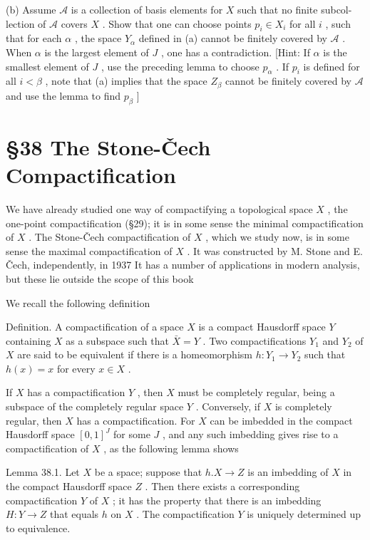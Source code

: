 (b) Assume \(\mathcal{A}\) is a collection of basis elements for \(X\) such that no finite subcol-lection of \(\mathcal{A}\) covers \(X\) . Show that one can choose points \({p}_{i} \in  {X}_{i}\) for all \(i\) , such that for each \(\alpha\) , the space \({Y}_{\alpha }\) defined in (a) cannot be finitely covered by \(\mathcal{A}\) . When \(\alpha\) is the largest element of \(J\) , one has a contradiction. [Hint: If \(\alpha\) is the smallest element of \(J\) , use the preceding lemma to choose \({p}_{\alpha }\) . If \({p}_{i}\) is defined for all \(i < \beta\) , note that (a) implies that the space \({Z}_{\beta }\) cannot be finitely covered by \(\mathcal{A}\) and use the lemma to find \({p}_{\beta }\) ]

\section*{§38 The Stone-Čech Compactification}

We have already studied one way of compactifying a topological space \(X\) , the one-point compactification (§29); it is in some sense the minimal compactification of \(X\) . The Stone-Čech compactification of \(X\) , which we study now, is in some sense the maximal compactification of \(X\) . It was constructed by M. Stone and E. Čech, independently, in 1937 It has a number of applications in modern analysis, but these lie outside the scope of this book

We recall the following definition

Definition. A compactification of a space \(X\) is a compact Hausdorff space \(Y\) containing \(X\) as a subspace such that \(\bar{X} = Y\) . Two compactifications \({Y}_{1}\) and \({Y}_{2}\) of \(X\) are said to be equivalent if there is a homeomorphism \(h : {Y}_{1} \rightarrow  {Y}_{2}\) such that \(h\left( x\right)  = x\) for every \(x \in  X\) .

If \(X\) has a compactification \(Y\) , then \(X\) must be completely regular, being a subspace of the completely regular space \(Y\) . Conversely, if \(X\) is completely regular, then \(X\) has a compactification. For \(X\) can be imbedded in the compact Hausdorff space \({\left\lbrack  0,1\right\rbrack  }^{J}\) for some \(J\) , and any such imbedding gives rise to a compactification of \(X\) , as the following lemma shows

Lemma 38.1. Let \(X\) be a space; suppose that \(h.X \rightarrow  Z\) is an imbedding of \(X\) in the compact Hausdorff space \(Z\) . Then there exists a corresponding compactification \(Y\) of \(X\) ; it has the property that there is an imbedding \(H : Y \rightarrow  Z\) that equals \(h\) on \(X\) . The compactification \(Y\) is uniquely determined up to equivalence.

